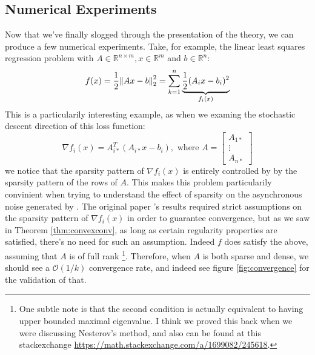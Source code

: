 \subsection{Numerical Experiments}
Now that we've finally slogged through the presentation of the theory, we can
produce a few numerical experiments. Take, for example, the linear least squares
regression problem with $A \in \mathbb{R}^{n \times m}, x \in \mathbb{R}^m$ and
$b \in \mathbb{R}^n$:
\[
  f(x) = \frac{1}{2}\norm{Ax-b}_2^2 
  = \sum_{k=1}^n 
  \underbrace{ \frac{1}{2} (A_ix - b_i)^2 }_{f_i(x)}
\]
This is a particularily interesting example, as when we examing the stochastic
descent direction of this loss function:
\[
  \nabla f_i(x) = A_{i*}^T(A_{i*}x - b_i), 
  \text{ where }
  A = 
  \begin{bmatrix}
    A_{1*} \\
    \vdots \\
    A_{n*}
  \end{bmatrix}
\]
we notice that the sparsity pattern of $\nabla f_i(x)$ is entirely controlled by
by the sparsity pattern of the rows of $A$. This makes this problem
particularily convinient when trying to understand the effect of sparsity on the
asynchronous noise generated by \hogwild. The original paper \cite{2011NRRW}'s
results required strict assumptions on the sparsity pattern of $\nabla f_i(x)$
in order to guarantee convergence, but as we saw in Theorem
\ref{thm:convexconv}, as long as certain regularity properties are satisfied,
there's no need for such an assumption. Indeed $f$ does satisfy the above,
assuming that $A$ is of full rank%
\footnote{
  One subtle note is that the second condition is actually equivalent to having
  upper bounded maximal eigenvalue. I think we proved this back when we were
  discussing Nesterov's method, and also can be found at this stackexchange
  \url{https://math.stackexchange.com/a/1699082/245618}.
}. Therefore, when $A$ is both sparse and dense, we should see
a $\mathcal{O}(1/k)$ convergence rate, and indeed see figure
\ref{fig:convergence} for the validation of that.
